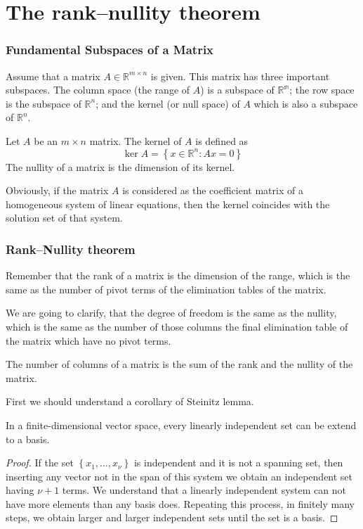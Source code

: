 \section{The rank--nullity theorem}
\begin{frame}\frametitle{Fundamental Subspaces of a Matrix}
    Assume that a matrix $A\in\mathbb{R}^{m\times n}$ is given.
    This matrix has three important subspaces.
    The \alert{column space} (the \alert{range} of $A$) is a subspace of $\mathbb{R^m}$; 
    the \alert{row space} is the subspace of $\mathbb{R}^n$; 
    and the \alert{kernel} (or null space) of $A$ which is also a subspace of $\mathbb{R}^n$.
    \begin{definition}
        Let $A$ be an $m\times n$ matrix.
        The \alert{kernel} of $A$ is defined as
        \[
            \ker{A}=\left\{ x\in\mathbb{R}^n: Ax=0 \right\}
        \]
        The \alert{nullity} of a matrix is the dimension of its kernel.
    \end{definition}
    Obviously, if the matrix $A$ is considered as the coefficient matrix of a homogeneous system of linear equations,
    then the kernel coincides with the solution set of that system.
\end{frame}
\begin{frame}\frametitle{Rank--Nullity theorem}
    Remember that the rank of a matrix is the dimension of the range,
    which is the same as the number of pivot terms of the elimination tables of the matrix.

    We are going to clarify, that the degree of freedom is the same as the nullity, 
    which is the same as the number of those columns the final 
    elimination table of the matrix which have no pivot terms.

    \begin{theorem}
        The number of columns of a matrix is the sum of the rank and the nullity of the matrix.
    \end{theorem}
\end{frame}
\begin{frame}
    First we should understand a corollary of Steinitz lemma.
    \begin{lemma}
        In a finite-dimensional vector space, every linearly independent set can be extend to a basis.
    \end{lemma}
\begin{proof}
    If the set $\left\{ x_1,\ldots,x_\nu \right\}$ is independent and it is not a spanning set,
    then inserting any vector not in the span of this system we obtain an independent set having $\nu+1$ terms.
    We understand that a linearly independent system can not have more elements than any basis does.
    Repeating this process, in finitely many steps, we obtain larger and larger independent sets
    until the set is a basis.
\end{proof}
\end{frame}
